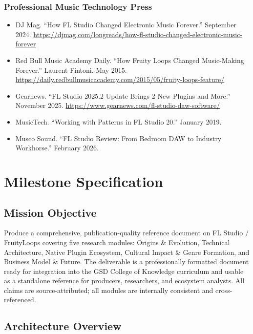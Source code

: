 \documentclass[11pt,letterpaper]{article}
\newcommand{\stageheader}[2]{%
  \noindent\colorbox{#2}{\makebox[\textwidth][l]{%
    \textcolor{white}{\bfseries\sffamily\hspace{6pt}#1\hspace{6pt}}}}%
  \vspace{0.5em}\par%
}
\begin{document}
\subsubsection{Professional Music Technology Press}
\begin{itemize}[noitemsep]
  \item DJ Mag. ``How FL Studio Changed Electronic Music Forever.'' September 2024. \url{https://djmag.com/longreads/how-fl-studio-changed-electronic-music-forever}
  \item Red Bull Music Academy Daily. ``How Fruity Loops Changed Music-Making Forever.'' Laurent Fintoni. May 2015. \url{https://daily.redbullmusicacademy.com/2015/05/fruity-loops-feature/}
  \item Gearnews. ``FL Studio 2025.2 Update Brings 2 New Plugins and More.'' November 2025. \url{https://www.gearnews.com/fl-studio-daw-software/}
  \item MusicTech. ``Working with Patterns in FL Studio 20.'' January 2019.
  \item Musco Sound. ``FL Studio Review: From Bedroom DAW to Industry Workhorse.'' February 2026.
\end{itemize}


\newpage
\stageheader{STAGE 3 --- MISSION PACKAGE}{tertiary}

\section{Milestone Specification}

\subsection{Mission Objective}

Produce a comprehensive, publication-quality reference document on FL Studio / FruityLoops covering five research modules: Origins \& Evolution, Technical Architecture, Native Plugin Ecosystem, Cultural Impact \& Genre Formation, and Business Model \& Future. The deliverable is a professionally formatted document ready for integration into the GSD College of Knowledge curriculum and usable as a standalone reference for producers, researchers, and ecosystem analysts. All claims are source-attributed; all modules are internally consistent and cross-referenced.

\subsection{Architecture Overview}
\end{document}
